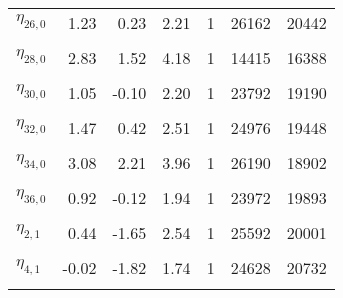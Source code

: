 \begin{table}
\begin{tabular}[t]{lrrrrrr}
$\eta_{26,  0}$ & 1.23 & 0.23 & 2.21 & 1 & 26162 & 20442\\
\cellcolor{gray!6}{$\eta_{27,  0}$} & \cellcolor{gray!6}{1.40} & \cellcolor{gray!6}{0.55} & \cellcolor{gray!6}{2.25} & \cellcolor{gray!6}{1} & \cellcolor{gray!6}{29489} & \cellcolor{gray!6}{19512}\\
$\eta_{28,  0}$ & 2.83 & 1.52 & 4.18 & 1 & 14415 & 16388\\
\cellcolor{gray!6}{$\eta_{29,  0}$} & \cellcolor{gray!6}{1.65} & \cellcolor{gray!6}{1.00} & \cellcolor{gray!6}{2.30} & \cellcolor{gray!6}{1} & \cellcolor{gray!6}{30901} & \cellcolor{gray!6}{21277}\\
$\eta_{30,  0}$ & 1.05 & -0.10 & 2.20 & 1 & 23792 & 19190\\
\cellcolor{gray!6}{$\eta_{31,  0}$} & \cellcolor{gray!6}{2.35} & \cellcolor{gray!6}{1.19} & \cellcolor{gray!6}{3.51} & \cellcolor{gray!6}{1} & \cellcolor{gray!6}{26209} & \cellcolor{gray!6}{18625}\\
$\eta_{32,  0}$ & 1.47 & 0.42 & 2.51 & 1 & 24976 & 19448\\
\cellcolor{gray!6}{$\eta_{33,  0}$} & \cellcolor{gray!6}{3.94} & \cellcolor{gray!6}{2.65} & \cellcolor{gray!6}{5.18} & \cellcolor{gray!6}{1} & \cellcolor{gray!6}{12412} & \cellcolor{gray!6}{13985}\\
$\eta_{34,  0}$ & 3.08 & 2.21 & 3.96 & 1 & 26190 & 18902\\
\cellcolor{gray!6}{$\eta_{35,  0}$} & \cellcolor{gray!6}{1.51} & \cellcolor{gray!6}{0.40} & \cellcolor{gray!6}{2.59} & \cellcolor{gray!6}{1} & \cellcolor{gray!6}{24300} & \cellcolor{gray!6}{19792}\\
$\eta_{36,  0}$ & 0.92 & -0.12 & 1.94 & 1 & 23972 & 19893\\
\cellcolor{gray!6}{$\eta_{1,  1}$} & \cellcolor{gray!6}{0.40} & \cellcolor{gray!6}{-1.16} & \cellcolor{gray!6}{1.93} & \cellcolor{gray!6}{1} & \cellcolor{gray!6}{26821} & \cellcolor{gray!6}{18974}\\
$\eta_{2,  1}$ & 0.44 & -1.65 & 2.54 & 1 & 25592 & 20001\\
\cellcolor{gray!6}{$\eta_{3,  1}$} & \cellcolor{gray!6}{2.10} & \cellcolor{gray!6}{0.42} & \cellcolor{gray!6}{3.87} & \cellcolor{gray!6}{1} & \cellcolor{gray!6}{13884} & \cellcolor{gray!6}{17298}\\
$\eta_{4,  1}$ & -0.02 & -1.82 & 1.74 & 1 & 24628 & 20732\\
\cellcolor{gray!6}{$\eta_{5,  1}$} & \cellcolor{gray!6}{-0.73} & \cellcolor{gray!6}{-2.69} & \cellcolor{gray!6}{1.11} & \cellcolor{gray!6}{1} & \cellcolor{gray!6}{19865} & \cellcolor{gray!6}{18555}\\

\end{tabular}
\end{table}
